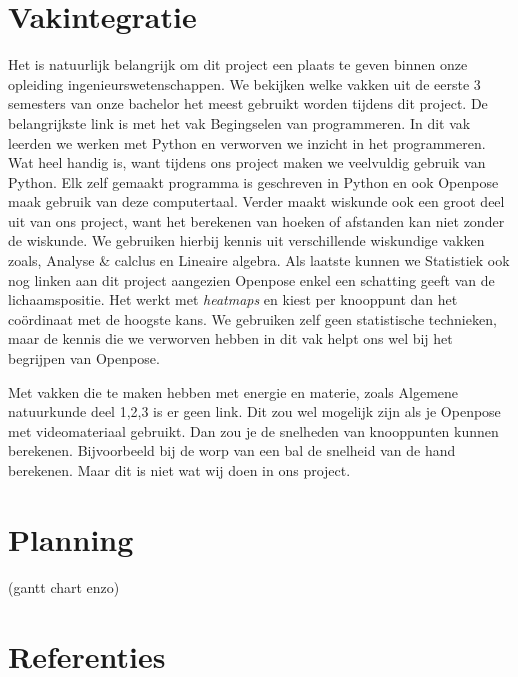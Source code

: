 \documentclass{article}
\begin{document}
\section{Vakintegratie}
Het is natuurlijk belangrijk om dit project een plaats te geven binnen onze opleiding ingenieurswetenschappen. We bekijken welke vakken uit de eerste 3 semesters van onze bachelor het meest gebruikt worden tijdens dit project. De belangrijkste link is met het vak Begingselen van programmeren. In dit vak leerden we werken met Python en verworven we inzicht in het programmeren. Wat heel handig is, want tijdens ons project maken we veelvuldig gebruik van Python. Elk zelf gemaakt programma is geschreven in Python en ook Openpose maak gebruik van deze computertaal. Verder maakt wiskunde ook een groot deel uit van ons project, want het berekenen van hoeken of afstanden kan niet zonder de wiskunde. We gebruiken hierbij kennis uit verschillende wiskundige vakken zoals, Analyse \& calclus en Lineaire algebra. Als laatste kunnen we Statistiek ook nog linken aan dit project aangezien Openpose enkel een schatting geeft van de lichaamspositie. Het werkt met \textit{heatmaps} en kiest per knooppunt dan het coördinaat met de hoogste kans. We gebruiken zelf geen statistische technieken, maar de kennis die we verworven hebben in dit vak helpt ons wel bij het begrijpen van Openpose. 

Met vakken die te maken hebben met energie en materie, zoals Algemene natuurkunde deel 1,2,3 is er geen link. Dit zou wel mogelijk zijn als je Openpose met videomateriaal gebruikt. Dan zou je de snelheden van knooppunten kunnen berekenen. Bijvoorbeeld bij de worp van een bal de snelheid van de hand berekenen. Maar dit is niet wat wij doen in ons project.
\section{Planning}
(gantt chart enzo\texttt{})

\section{Referenties}
\end{document}

